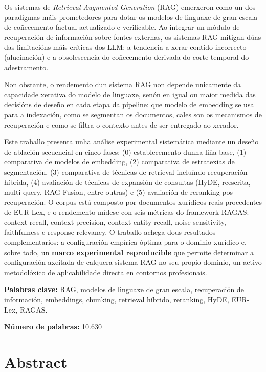 \documentclass[11pt, a4paper, oneside]{report}
\begin{document}
Os sistemas de \textit{Retrieval-Augmented Generation} (RAG) emerxeron como un dos
paradigmas máis prometedores para dotar os modelos de linguaxe de gran escala de
coñecemento factual actualizado e verificable. Ao integrar un módulo de recuperación
de información sobre fontes externas, os sistemas RAG mitigan dúas das limitacións
máis críticas dos LLM: a tendencia a xerar contido incorrecto (alucinación) e a
obsolescencia do coñecemento derivada do corte temporal do adestramento.

Non obstante, o rendemento dun sistema RAG non depende unicamente da capacidade xerativa
do modelo de linguaxe, senón en igual ou maior medida das decisións de deseño en cada
etapa da pipeline: que modelo de embedding se usa para a indexación, como se segmentan
os documentos, cales son os mecanismos de recuperación e como se filtra o contexto
antes de ser entregado ao xerador.

Este traballo presenta unha análise experimental sistemática mediante un deseño de
ablación secuencial en cinco fases: (0) establecemento dunha liña base, (1) comparativa
de modelos de embedding, (2) comparativa de estratexias de segmentación, (3) comparativa
de técnicas de retrieval incluíndo recuperación híbrida, (4) avaliación de técnicas de
expansión de consultas (HyDE, reescrita, multi-query, RAG-Fusion, entre outras) e (5)
avaliación de reranking pos-recuperación. O corpus está composto por documentos xurídicos
reais procedentes de EUR-Lex, e o rendemento mídese con seis métricas do framework RAGAS:
context recall, context precision, context entity recall, noise sensitivity, faithfulness
e response relevancy. O traballo achega dous resultados complementarios: a configuración
empírica óptima para o dominio xurídico e, sobre todo, un \textbf{marco experimental
reproducible} que permite determinar a configuración axeitada de calquera sistema RAG no
seu propio dominio, un activo metodolóxico de aplicabilidade directa en contornos
profesionais.

\vspace{1em}
\noindent\textbf{Palabras clave:} RAG, modelos de linguaxe de gran escala, recuperación de
información, embeddings, chunking, retrieval híbrido, reranking, HyDE, EUR-Lex, RAGAS.

\noindent\textbf{Número de palabras:} 10.630

\clearpage

\chapter*{Abstract}
\end{document}
